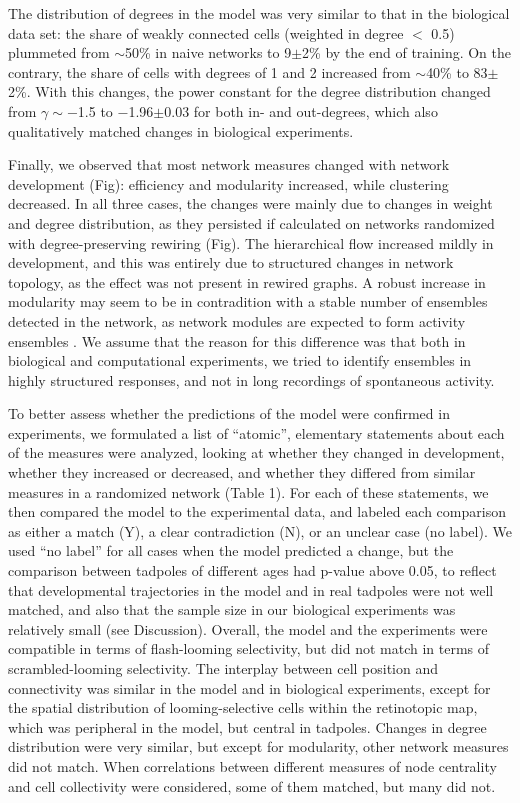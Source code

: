 \documentclass{article}
\begin{document}
The distribution of degrees in the model was very similar to that in the biological data set: the share of weakly connected cells (weighted in degree $<$ 0.5) plummeted from $\sim$50\% in naive networks to 9$\pm$2\% by the end of training. On the contrary, the share of cells with degrees of 1 and 2 increased from $\sim$40\% to 83$\pm$2\%. With this changes, the power constant for the degree distribution changed from $\gamma \sim -$1.5 to $-$1.96$\pm$0.03 for both in- and out-degrees, which also qualitatively matched changes in biological experiments.

Finally, we observed that most network measures changed with network development (Fig): efficiency and modularity increased, while clustering decreased. In all three cases, the changes were mainly due to changes in weight and degree distribution, as they persisted if calculated on networks randomized with degree-preserving rewiring (Fig). The hierarchical flow increased mildly in development, and this was entirely due to structured changes in network topology, as the effect was not present in rewired graphs. A robust increase in modularity may seem to be in contradition with a stable number of ensembles detected in the network, as network modules are expected to form activity ensembles \citep{triplett2018emergence}. We assume that the reason for this difference was that both in biological and computational experiments, we tried to identify ensembles in highly structured responses, and not in long recordings of spontaneous activity.

To better assess whether the predictions of the model were confirmed in experiments, we formulated a list of “atomic”, elementary statements about each of the measures were analyzed, looking at whether they changed in development, whether they increased or decreased, and whether they differed from similar measures in a randomized network (Table 1). For each of these statements, we then compared the model to the experimental data, and labeled each comparison as either a match (Y), a clear contradiction (N), or an unclear case (no label). We used “no label” for all cases when the model predicted a change, but the comparison between tadpoles of different ages had p-value above 0.05, to reflect that developmental trajectories in the model and in real tadpoles were not well matched, and also that the sample size in our biological experiments was relatively small (see Discussion). Overall, the model and the experiments were compatible in terms of flash-looming selectivity, but did not match in terms of scrambled-looming selectivity. The interplay between cell position and connectivity was similar in the model and in biological experiments, except for the spatial distribution of looming-selective cells within the retinotopic map, which was peripheral in the model, but central in tadpoles. Changes in degree distribution were very similar, but except for modularity, other network measures did not match. When correlations between different measures of node centrality and cell collectivity were considered, some of them matched, but many did not.
\end{document}
